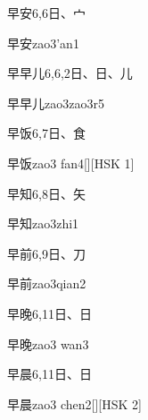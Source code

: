 \begin{entry}{早安}{6,6}{⽇、⼧}
  \begin{phonetics}{早安}{zao3'an1}
  \end{phonetics}
\end{entry}

\begin{entry}{早早儿}{6,6,2}{⽇、⽇、⼉}
  \begin{phonetics}{早早儿}{zao3zao3r5}
  \end{phonetics}
\end{entry}

\begin{entry}{早饭}{6,7}{⽇、⾷}
  \begin{phonetics}{早饭}{zao3 fan4}[][HSK 1]
  \end{phonetics}
\end{entry}

\begin{entry}{早知}{6,8}{⽇、⽮}
  \begin{phonetics}{早知}{zao3zhi1}
  \end{phonetics}
\end{entry}

\begin{entry}{早前}{6,9}{⽇、⼑}
  \begin{phonetics}{早前}{zao3qian2}
  \end{phonetics}
\end{entry}

\begin{entry}{早晚}{6,11}{⽇、⽇}
  \begin{phonetics}{早晚}{zao3 wan3}
  \end{phonetics}
\end{entry}

\begin{entry}{早晨}{6,11}{⽇、⽇}
  \begin{phonetics}{早晨}{zao3 chen2}[][HSK 2]
  \end{phonetics}
\end{entry}

